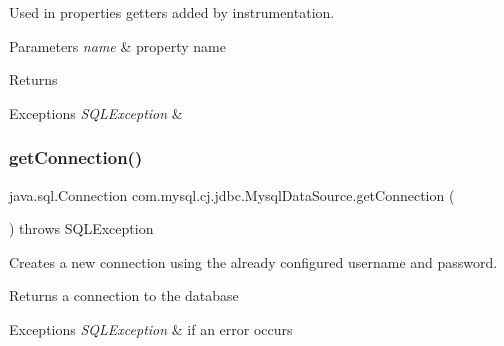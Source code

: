Used in properties getters added by instrumentation.


\begin{DoxyParams}{Parameters}
{\em name} & property name \\
\hline
\end{DoxyParams}
\begin{DoxyReturn}{Returns}

\end{DoxyReturn}

\begin{DoxyExceptions}{Exceptions}
{\em S\+Q\+L\+Exception} & \\
\hline
\end{DoxyExceptions}
\mbox{\label{classcom_1_1mysql_1_1cj_1_1jdbc_1_1_mysql_data_source_a585676b84163ab8ebd4ed84af71a80ea}} 
\subsubsection{\texorpdfstring{get\+Connection()}{getConnection()}\hspace{0.1cm}{\footnotesize\ttfamily [1/3]}}
{\footnotesize\ttfamily java.\+sql.\+Connection com.\+mysql.\+cj.\+jdbc.\+Mysql\+Data\+Source.\+get\+Connection (\begin{DoxyParamCaption}{ }\end{DoxyParamCaption}) throws S\+Q\+L\+Exception}

Creates a new connection using the already configured username and password.

\begin{DoxyReturn}{Returns}
a connection to the database
\end{DoxyReturn}

\begin{DoxyExceptions}{Exceptions}
{\em S\+Q\+L\+Exception} & if an error occurs \\
\hline
\end{DoxyExceptions}
\mbox{\label{classcom_1_1mysql_1_1cj_1_1jdbc_1_1_mysql_data_source_ae210ba178fafb65d2f2b57ff6697ae60}} 
